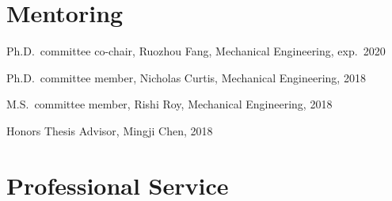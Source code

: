 \vspace{\baselineskip}

\section{\sectionfont{} Mentoring}

\begin{lonelist}
\item Ph.D.\ committee co-chair, Ruozhou Fang, Mechanical Engineering, exp.\ 2020
\item Ph.D.\ committee member, Nicholas Curtis, Mechanical Engineering, 2018
\item M.S.\ committee member, Rishi Roy, Mechanical Engineering, 2018
\item Honors Thesis Advisor, Mingji Chen, 2018
\end{lonelist}

\vspace{\baselineskip}

\section{{\sectionfont Professional Service}}

